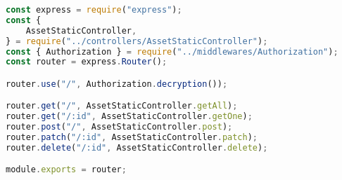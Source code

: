 \begin{lstlisting}[language=Javascript,caption={Asset Static Route}]
const express = require("express");
const {
	AssetStaticController,
} = require("../controllers/AssetStaticController");
const { Authorization } = require("../middlewares/Authorization");
const router = express.Router();

router.use("/", Authorization.decryption());

router.get("/", AssetStaticController.getAll);
router.get("/:id", AssetStaticController.getOne);
router.post("/", AssetStaticController.post);
router.patch("/:id", AssetStaticController.patch);
router.delete("/:id", AssetStaticController.delete);

module.exports = router;
\end{lstlisting}